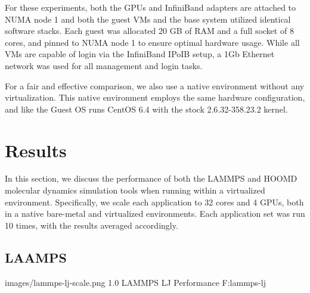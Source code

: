 \documentclass{sigplanconf}
\begin{document}
For these experiments, both the GPUs and InfiniBand adapters are attached to NUMA node 1 and both the guest VMs and the base system utilized identical software stacks.  Each guest was allocated 20 GB of RAM and a full socket of 8 cores, and pinned to NUMA node 1 to ensure optimal hardware usage. While all VMs are capable of login via the InfiniBand IPoIB setup, a 1Gb Ethernet network was used for all management and login tasks.  


For a fair and effective comparison, we also use a native environment without any virtualization. This native environment employs the same hardware configuration, and like the Guest OS runs CentOS 6.4 with the stock 2.6.32-358.23.2 kernel. 


 
\section{Results}

In this section, we discuss the performance of both the LAMMPS and HOOMD molecular dynamics simulation tools when running within a virtualized environment. Specifically, we scale each application to 32 cores and 4 GPUs, both in a native bare-metal and virtualized environments.  Each application set was run 10 times, with the results averaged accordingly. 

\subsection{LAAMPS}

  {images/lammps-lj-scale.png}
  {1.0}
  {LAMMPS LJ Performance}
  {F:lammps-lj}
\end{document}
